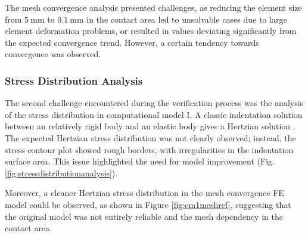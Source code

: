 The mesh convergence analysis presented challenges, as reducing the element size from $\SI{5}{\milli\meter}$ to 
$\SI{0.1}{\milli\meter}$ in the contact area led to unsolvable cases due to large element deformation problems, 
or resulted in values deviating significantly from the expected convergence trend. However, a certain tendency 
towards convergence was observed.

\subsubsection*{Stress Distribution Analysis}
The second challenge encountered during the verification process was the analysis of the stress distribution in 
computational model I. A classic indentation solution between an relatively rigid body and an elastic body gives a Hertzian 
solution \cite{Lin2009}. The expected Hertzian stress distribution was not clearly observed; instead, the stress 
contour plot showed rough borders, with irregularities in the indentation surface area. This issue highlighted
the need for model improvement (Fig. \ref{fig:stressdistributionanalysis}).

Moreover, a cleaner Hertzian stress distribution in the mesh convergence FE model could be observed, as shown in Figure \ref{fig:cm1meshref}, 
suggesting that the original model was not entirely reliable and the mesh dependency in the contact area.

